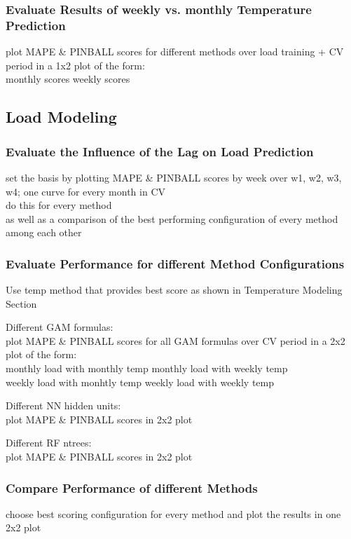 \documentclass[conference]{IEEEtran}
\begin{document}
\subsubsection{Evaluate Results of weekly vs. monthly Temperature Prediction}
plot MAPE \& PINBALL scores for different methods over load training + CV period in a 1x2 plot of the form:\\
monthly scores \quad weekly scores

\subsection{Load Modeling}

\subsubsection{Evaluate the Influence of the Lag on Load Prediction}
set the basis by plotting MAPE \& PINBALL scores by week over w1, w2, w3, w4; one curve for every month in CV\\
do this for every method\\
as well as a comparison of the best performing configuration of every method among each other\\

\subsubsection{Evaluate Performance for different Method Configurations}
Use temp method that provides best score as shown in Temperature Modeling Section\par
Different GAM formulas:\\
plot MAPE \& PINBALL scores for all GAM formulas over CV period in a 2x2 plot of the form:\\
monthly load with monthly temp \quad monthly load with weekly temp\\
weekly load with monhtly temp \quad weekly load with weekly temp\par
\vspace*{5pt}
Different NN hidden units:\\
plot MAPE \& PINBALL scores in 2x2 plot\par
Different RF ntrees:\\ 
plot MAPE \& PINBALL scores in 2x2 plot\par

\subsubsection{Compare Performance of different Methods}
choose best scoring configuration for every method and plot the results in one 2x2 plot
\end{document}
